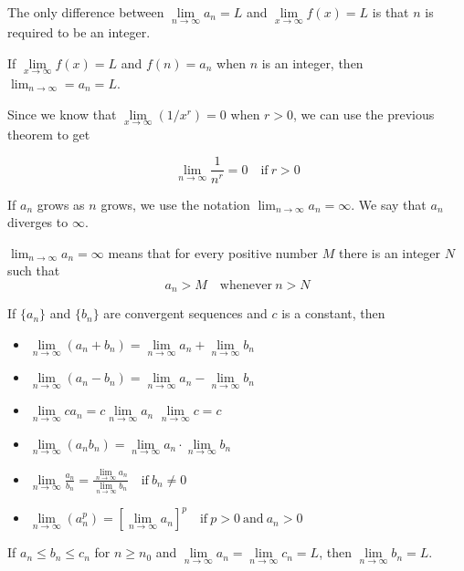   The only difference between $\lim\limits_{n \to \infty} a_n = L$ and $\lim\limits_{x \to \infty} f(x) = L$ is that $n$ is required to be an integer.
  \begin{theorem}
    If $\lim\limits_{x \to \infty} f(x) = L$ and $f(n)=a_n$ when $n$ is an integer, then $\lim_{n \to \infty} = a_n = L$.
  \end{theorem}
  Since we know that $\lim\limits_{x \to \infty} (1/x^r)=0$ when $r>0$, we can use the previous theorem to get
  \begin{definition}
    $$\lim_{n \to \infty} \frac{1}{n^r}=0 \quad \text{if}\ r>0$$
  \end{definition}
  If $a_n$ grows as $n$ grows, we use the notation $\lim_{n \to \infty} a_n = \infty$. We say that $a_n$ diverges to $\infty$.
  \begin{definition}
    $\lim_{n \to \infty} a_n = \infty$ means that for every positive number $M$ there is an integer $N$ such that
    $$a_n>M \quad \text{whenever}\ n>N$$
  \end{definition}
  \begin{definition}
    If $\{a_n\}$ and $\{b_n\}$ are convergent sequences and $c$ is a constant, then
   \begin{itemize}
     \item[] $\lim\limits_{n \to \infty} (a_n + b_n) = \lim\limits_{n \to \infty} a_n + \lim\limits_{n \to \infty} b_n$
     \item[] $\lim\limits_{n \to \infty} (a_n - b_n) = \lim\limits_{n \to \infty} a_n - \lim\limits_{n \to \infty} b_n$
     \item[] $\lim\limits_{n \to \infty} ca_n = c\lim\limits_{n \to \infty} a_n$ \hspace{100pt} $\lim\limits_{n \to \infty} c = c$
     \item[] $\lim\limits_{n \to \infty} (a_n b_n) = \lim\limits_{n \to \infty} a_n \cdot \lim\limits_{n \to \infty} b_n$
     \item[] $\lim\limits_{n \to \infty} \frac{a_n}{b_n} = \frac{\lim\limits_{n \to \infty} a_n}{\lim\limits_{n \to \infty} b_n} \quad \text{if}\ b_n \neq 0$
     \item[] $\lim\limits_{n \to \infty} (a_{n}^{p}) = \left[\lim\limits_{n \to \infty} a_n\right]^p \quad \text{if}\ p > 0\ \text{and}\ a_n > 0$
   \end{itemize}
  \end{definition}
  \begin{theorem}
    If $a_n \leq b_n \leq c_n$ for $n \geq n_0$ and $\lim\limits_{n \to \infty} a_n = \lim\limits_{n \to \infty} c_n = L$, then $\lim\limits_{n \to \infty} b_n = L$.
  \end{theorem}
